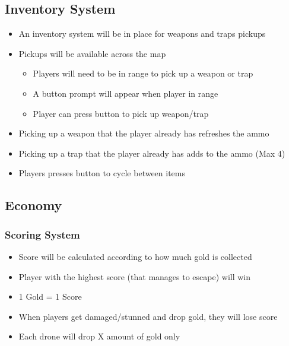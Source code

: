 \documentclass[14pt]{report}
\begin{document}
\subsection{Inventory System}
\begin{itemize}
    \item An inventory system will be in place for weapons and traps pickups
    \item Pickups will be available across the map 
    \begin{itemize}
        \item Players will need to be in range to pick up a weapon or trap
        \item A button prompt will appear when player in range
        \item Player can press button to pick up weapon/trap
    \end{itemize}
    \item Picking up a weapon that the player already has refreshes the ammo
    \item Picking up a trap that the player already has adds to the ammo (Max 4)
    \item Players presses button to cycle between items
\end{itemize}
\subsection{Economy}
\subsubsection{Scoring System}
\begin{itemize}
    \item Score will be calculated according to how much gold is collected
    \item Player with the highest score (that manages to escape) will win
    \item 1 Gold = 1 Score
    \item When players get damaged/stunned and drop gold, they will lose score
    \item Each drone will drop X amount of gold only
\end{itemize}
\end{document}

